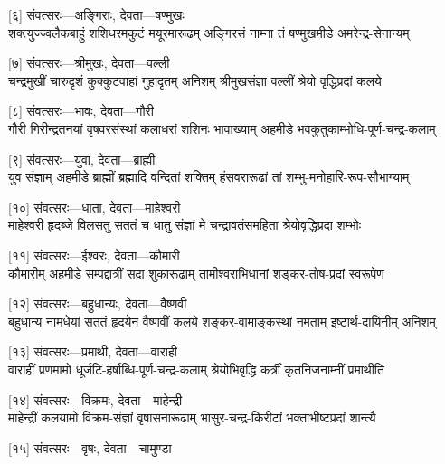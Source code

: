 [६] संवत्सरः—अङ्गिराः, देवता—षण्मुखः\\

\twolineshloka
{शक्त्युज्ज्वलैकबाहुं शशिधरमकुटं मयूरमारूढम्}
{अङ्गिरसं नाम्ना तं षण्मुखमीडे अमरेन्द्र-सेनान्यम्} %

[७] संवत्सरः—श्रीमुखः, देवता—वल्ली\\

\twolineshloka
{चन्द्रमुखीं चारुदृशं कुक्कुटवाहां गुहादृतम् अनिशम्}
{श्रीमुखसंज्ञा वल्लीं श्रेयो वृद्धिप्रदां कलये} %

[८] संवत्सरः—भावः, देवता—गौरी\\

\twolineshloka
{गौरी गिरीन्द्रतनयां वृषवरसंस्थां कलाधरां शशिनः}
{भावाख्याम् अहमीडे भवकुतुकाम्भोधि-पूर्ण-चन्द्र-कलाम्} %

[९] संवत्सरः—युवा, देवता—ब्राह्मी\\

\twolineshloka
{युव संज्ञाम् अहमीडे ब्राह्मीं ब्रह्मादि वन्दितां शक्तिम्}
{हंसवरारूढां तां शम्भु-मनोहारि-रूप-सौभाग्याम्} %

[१०] संवत्सरः—धाता, देवता—माहेश्वरी\\

\twolineshloka
{माहेश्वरी हृदब्जे विलसतु सततं च धातु संज्ञां मे}
{चन्द्रावतंसमहिता श्रेयोवृद्धिप्रदा शम्भोः} %

[११] संवत्सरः—ईश्वरः, देवता—कौमारी\\

\twolineshloka
{कौमारीम् अहमीडे सम्पद्दात्रीं सदा शुकारूढाम्}
{तामीश्वराभिधानां शङ्कर-तोष-प्रदां स्वरूपेण} %

[१२] संवत्सरः—बहुधान्यः, देवता—वैष्णवी\\

\twolineshloka
{बहुधान्य नामधेयां सततं हृदयेन वैष्णवीं कलये}
{शङ्कर-वामाङ्कस्थां नमताम् इष्टार्थ-दायिनीम् अनिशम्} %

[१३] संवत्सरः—प्रमाथी, देवता—वाराही\\

\twolineshloka
{वाराहीं प्रणमामो धूर्जटि-हर्षाब्धि-पूर्ण-चन्द्र-कलाम्}
{श्रेयोभिवृद्धि कर्त्रीं कृतनिजनाम्नीं प्रमाथीति} %

[१४] संवत्सरः—विक्रमः, देवता—माहेन्द्री\\

\twolineshloka
{माहेन्द्रीं कलयामो विक्रम-संज्ञां वृषासनारूढाम्}
{भासुर-चन्द्र-किरीटां भक्ताभीष्टप्रदां शान्त्यै} %

[१५] संवत्सरः—वृषः, देवता—चामुण्डा\\

